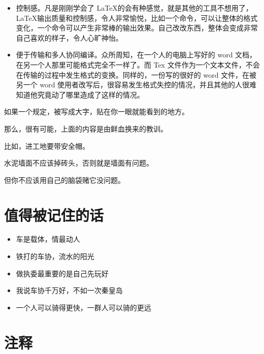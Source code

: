 \documentclass{ctexbook}
\begin{document}
\begin{tcolorbox}[title=这份手册为什么要用 \LaTeX 来写，\LaTeX 相比于 word 有什么好处]
    \begin{itemize}
        \item  控制感。凡是刚刚学会了 \LaTeX 的会有种感觉，就是其他的工具不想用了，\LaTeX 输出质量和控制感，令人非常愉悦，比如一个命令，可以让整体的格式变化，一个命令可以产生非常棒的输出效果。自己改改东西，整体会变成非常自己喜欢的样子，令人心旷神怡。
        \item  便于传输和多人协同编译。众所周知，在一个人的电脑上写好的 word 文档，在另一个人那里可能格式完全不一样了。而 Tex 文件作为一个文本文件，不会在传输的过程中发生格式的变换。同样的，一份写的很好的 word 文件，在被另一个 word 使用者改写后，很容易发生格式失控的情况，并且其他的人很难知道他究竟动了哪里造成了这样的情况。
    \end{itemize}

\end{tcolorbox}
\begin{tcolorbox}[title=为什么车协总是有这么多nt规定，比如不允许擅自超越前骑或者指责前骑]
    如果一个规定，被写成大字，贴在你一眼就能看到的地方。

    那么，很有可能，上面的内容是由鲜血换来的教训。
    
    比如，进工地要带安全帽。
    
    水泥墙面不应该掉砖头，否则就是墙面有问题。
    
    但你不应该用自己的脑袋赌它没问题。
\end{tcolorbox}
\section{值得被记住的话} 
\begin{itemize}
    \item 车是载体，情最动人
    \item 铁打的车协，流水的阳光
    \item 做执委最重要的是自己先玩好
    \item 我说车协千万好，不如一次秦皇岛
    \item 一个人可以骑得更快，一群人可以骑的更远
\end{itemize}
\section{注释}
\listoftodos[Notes]
\end{document}
